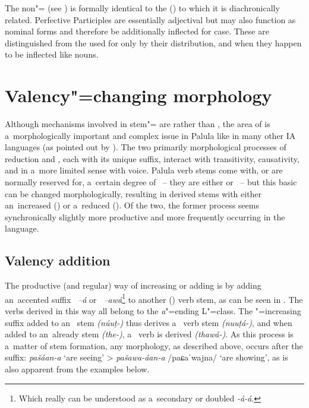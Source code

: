 The non"=  (see ) is formally identical to the   () to which it is diachronically related. Perfective Participles are essentially adjectival but may also function as nominal forms and therefore be additionally inflected for case. These are distinguished from the  used for   only by their distribution, and when they happen to be inflected like nouns.


\section{Valency"=changing morphology}
\label{sec:8-5}

Although mechanisms involved in stem"= are  rather than , the area of  is a~morphologically important and complex issue in Palula like in many other IA languages (as pointed out by \citealt[315]{masica1991}). The two primarily morphological processes of  reduction and , each with its unique suffix, interact with transitivity, causativity, and in a~more limited sense with voice. Palula verb stems come with, or are normally reserved for, a~certain degree of ~-- they are either  or ~-- but this basic  can be changed morphologically, resulting in derived stems with either an~increased  () or a~reduced  (). Of the two, the former process seems synchronically slightly more productive and more frequently occurring in the language.


\subsection{Valency addition}
\label{subsec:8-5-1}

The productive (and regular) way of increasing or adding  is by adding an~accented suffix \textit{~--á} or \textit{~--awá}\footnote{Which really can be understood as a~secondary or
  doubled  \textit{-á-á}.} to another () verb stem, as can be seen in
. The verbs derived in this way all belong to the \textit{a}"=ending L"=class. The "=increasing suffix added to an~  stem \mbox{\textit{(núuṭ-)}} thus derives a~  verb stem \textit{(nuuṭá-)}, and when added to an~already  stem \textit{(the-)}, a~ verb is derived \textit{(thawá-)}. As this process is a~matter of stem formation, any  morphology, as described above, occurs after the  suffix: \textit{pašáan-a} `are seeing' {\textgreater} \textit{pašawa-áan-a} /paɕaˈwajna/ `are showing', as is also apparent from the examples below.


